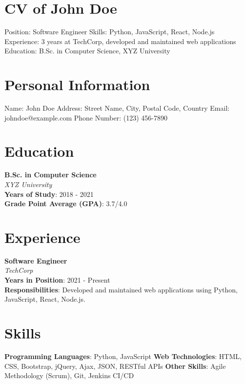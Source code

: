 \documentclass[12pt]{article}
\begin{document}
\section*{CV of John Doe}
\addtolength{\baselineskip}{-10pt} %
\Large 
\normalsize
Position: Software Engineer
Skills: Python, JavaScript, React, Node.js
Experience: 3 years at TechCorp, developed and maintained web applications
Education: B.Sc. in Computer Science, XYZ University

\newpage

\section{Personal Information}
Name: John Doe
Address: Street Name, City, Postal Code, Country
Email: johndoe@example.com
Phone Number: (123) 456-7890

\section{Education}
\textbf{B.Sc. in Computer Science} \\
\emph{XYZ University} \\
\textbf{Years of Study}: 2018 - 2021\\
\textbf{Grade Point Average (GPA)}: 3.7/4.0

\section{Experience}
\textbf{Software Engineer} \\
\emph{TechCorp} \\
\textbf{Years in Position}: 2021 - Present\\
\textbf{Responsibilities}: Developed and maintained web applications using Python, JavaScript, React, Node.js.

\section{Skills}
\textbf{Programming Languages}: Python, JavaScript
\textbf{Web Technologies}: HTML, CSS, Bootstrap, jQuery, Ajax, JSON, RESTful APIs
\textbf{Other Skills}: Agile Methodology (Scrum), Git, Jenkins CI/CD
\end{document}

